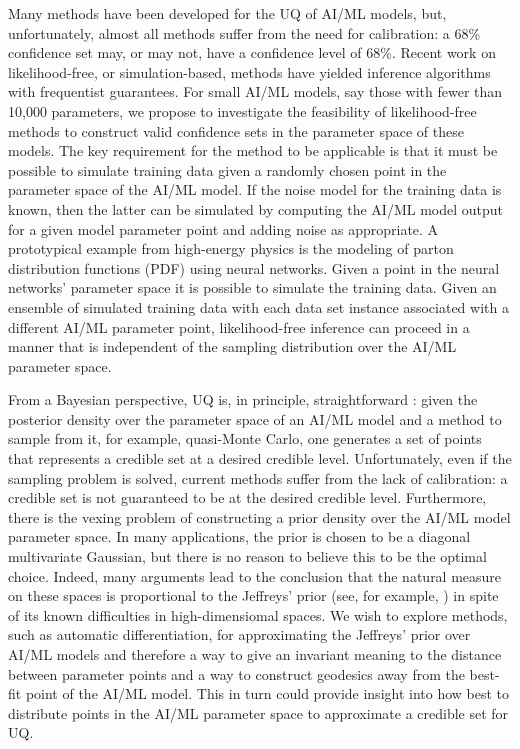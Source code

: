 \documentclass[11pt,titlepage,
preprint,
aps,prd,
nofootinbib,
superscriptaddress,
showpacs,
amsmath,
amssymb
]{article}
\begin{document}
\vspace{12pt}{\bf Likelihood-free methods.}
Many methods have been developed for the UQ of AI/ML models\cite{ABDAR2021243}, but, unfortunately, almost all methods suffer from the need for calibration: a 68\% confidence set may, or may not, have a confidence level of 68\%. Recent work on
likelihood-free, or simulation-based, methods \cite{Lee2021} have yielded inference algorithms with frequentist guarantees. For small AI/ML models, say those with fewer than 10,000 parameters, we propose to investigate the feasibility of likelihood-free methods to construct valid confidence sets in the parameter space of these models.
The key requirement for the method to be applicable is that it must be possible to simulate training data given a randomly chosen point in the parameter space of the AI/ML model. If the noise model for the training data is known, then the latter can be simulated by computing the AI/ML model output for a given model parameter point and adding noise as appropriate.  A prototypical example from high-energy physics is the modeling of parton distribution functions (PDF) using neural networks. Given a point in the neural networks' parameter space it is possible to simulate the training data.
Given an ensemble of simulated training data with each data set instance associated with a different AI/ML parameter point, likelihood-free inference can proceed in a manner that is independent of the sampling distribution over the AI/ML parameter space.

\vspace{12pt}{\bf Large-scale Bayesian approaches.}
From a Bayesian perspective, UQ is, in principle, straightforward \cite{kristiadi2022frequentist}: given the posterior density over the parameter space of an AI/ML model and a method to sample from it, for example, quasi-Monte Carlo, one generates a set of points that represents a credible set at a desired credible level. Unfortunately, even if the sampling problem is solved, current methods suffer from the lack of calibration: a credible set is not guaranteed to be at the desired credible level. Furthermore, there is the vexing problem of constructing a prior density over the AI/ML model parameter space. In many applications, the prior is chosen to be a diagonal multivariate Gaussian, but there is no reason to believe this to be the optimal choice. Indeed, many arguments lead to the conclusion that the natural measure on these spaces is proportional to the Jeffreys' prior (see, for example, \cite{Bala}) in spite of its known difficulties in high-dimensiomal spaces. We wish to explore methods, such as automatic differentiation, for approximating the Jeffreys' prior over AI/ML models and therefore a way to give an invariant meaning to the distance between parameter points and a way to construct geodesics away from the best-fit point of the AI/ML model. This in turn could provide insight into how best to distribute points in the AI/ML parameter space to approximate a credible set for UQ. 




\end{document}
